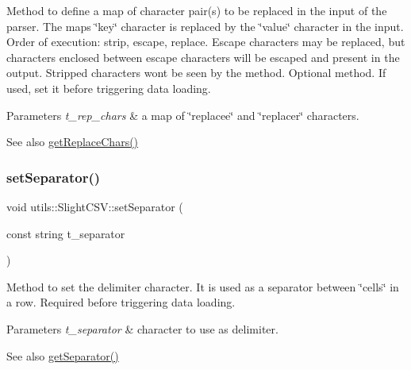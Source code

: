 Method to define a map of character pair(s) to be replaced in the input of the parser. The map\textquotesingle{}s \char`\"{}key\char`\"{} character is replaced by the \char`\"{}value\char`\"{} character in the input. Order of execution\+: strip, escape, replace. Escape characters may be replaced, but characters enclosed between escape characters will be escaped and present in the output. Stripped characters won\textquotesingle{}t be seen by the method. Optional method. If used, set it before triggering data loading. 
\begin{DoxyParams}{Parameters}
{\em t\+\_\+rep\+\_\+chars} & a map of \char`\"{}replacee\char`\"{} and \char`\"{}replacer\char`\"{} characters. \\
\hline
\end{DoxyParams}
\begin{DoxySeeAlso}{See also}
\hyperlink{classutils_1_1SlightCSV_a4223375a011075fe889fc82db2babe4e}{get\+Replace\+Chars()} 
\end{DoxySeeAlso}
\mbox{\label{classutils_1_1SlightCSV_a1192b4987bbe595ee893ac8fdc7ebd45}} 
\subsubsection{\texorpdfstring{set\+Separator()}{setSeparator()}}
{\footnotesize\ttfamily void utils\+::\+Slight\+C\+S\+V\+::set\+Separator (\begin{DoxyParamCaption}\item[{const string}]{t\+\_\+separator }\end{DoxyParamCaption})}

Method to set the delimiter character. It is used as a separator between \char`\"{}cells\char`\"{} in a row. Required before triggering data loading. 
\begin{DoxyParams}{Parameters}
{\em t\+\_\+separator} & character to use as delimiter. \\
\hline
\end{DoxyParams}
\begin{DoxySeeAlso}{See also}
\hyperlink{classutils_1_1SlightCSV_ac5a81169c5da9aade5d96935428c73ea}{get\+Separator()} 
\end{DoxySeeAlso}
\mbox{\label{classutils_1_1SlightCSV_ad432022553ea99a4719f618378abe586}} 
